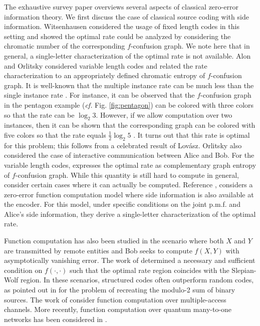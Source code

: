\documentclass[journal, onecolumn, draftcls]{IEEEtran}
\theoremstyle{definition}
\begin{document}
The exhaustive survey paper \cite{KornerO_98} overviews several aspects of classical zero-error information theory. We first discuss the case of  classical source coding with side information. 
Witsenhausen \cite{Witsenhausen_76} considered the usage of fixed length codes in this setting and showed the optimal rate could be analyzed by considering the chromatic number of the corresponding $f$-confusion graph. We note here that in general, a single-letter characterization of the optimal rate is not available. 
Alon and Orlitsky  \cite{AlonO_96} considered variable length codes and related the rate characterization to an appropriately defined chromatic entropy of $f$-confusion graph. It is well-known that the multiple instance rate can be much less than the single instance rate \cite{KornerO_98}. For instance, it can be observed that the $f$-confusion graph in the pentagon example ({\it cf.} Fig. \ref{fig:pentagon}) can be colored with three colors so that the rate can be $\log_2 3$. However, if we allow computation over two instances, then it can be shown that the corresponding graph can be colored with five colors so that the rate equals $\frac{1}{2} \log_2 5$ \cite{Witsenhausen_76,lovasz1979shannon}. It turns out that this rate is optimal for this problem; this follows from a celebrated result of Lov{\'a}sz\cite{lovasz1979shannon}.  Orlitsky \cite{orlitsky_worst_case90} also considered the case of interactive communication between Alice and Bob. For the variable length codes, \cite{KoulgiTRR_03} expresses the optimal rate as complementary graph entropy of $f$-confusion graph. While this quantity is still hard to compute in general, \cite{CharpenayTR23ISIT} consider certain cases where it can actually be computed. Reference \cite{CharpenayTR23ITW}, considers a zero-error function computation model where side information is also available at the encoder. For this model, under specific conditions on the joint p.m.f. and Alice's side information, they derive a single-letter characterization of the optimal rate.

Function computation has also been studied in the scenario where both $X$ and $Y$ are transmitted by remote entities and Bob seeks to compute $f(X,Y)$ with asymptotically vanishing error. The work of \cite{HanK87} determined a necessary and sufficient condition on $f(\cdot, \cdot)$ such that the optimal rate region coincides with the Slepian-Wolf region. In these scenarios, structured codes often outperform random codes, as pointed out in \cite{KornerM79} for the problem of recreating the modulo-2 sum of binary sources. The work of \cite{NazerG07, wilson_etal10} consider function computation over multiple-access channels. More recently, function computation over quantum many-to-one networks has been considered in \cite{AllaixLYPHCJ24}.
\end{document}
